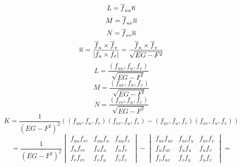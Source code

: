 \documentclass[main]{subfiles}
\begin{document}
    \begin{Proof}
      \[L = \overline{f}_{uu} \overline{n}\]
      \[M = \overline{f}_{uv} \overline{n}\]
      \[N = \overline{f}_{vv} \overline{n}\]
      \[\overline{n} = \frac{\overline{f}_u \times \overline{f}_v}{|f_u \times f_v|} = \frac{\overline{f}_u \times \overline{f}_v}{\sqrt{EG - F^2}}\]
      \[L = \frac{(f_{uu}, f_u, f_v)}{\sqrt{EG - F^2}}\]
      \[M = \frac{(f_{uv}, f_u, f_v)}{\sqrt{EG - F^2}}\]
      \[N = \frac{(f_{vv}, f_u, f_v)}{\sqrt{EG - F^2}}\]
      \[K = \frac{1}{(EG - F^2)^2} ( (f_{uu}, f_u, f_v)(f_{vv}, f_u, f_v) - (f_{uv}, f_u, f_v)(f_{uv}, f_u, f_v) )\]
      \[= \frac{1}{(EG - F^2)^2} \begin{vmatrix}
        f_{uu}f_{vv} & f_{uu}f_{u} & f_{uu}f_{v}\\
        f_{u}f_{vv} & f_{u}f_{u} & f_{u}f_{v}\\
        f_{v}f_{vv} & f_{v}f_{u} & f_{v}f_{v}
      \end{vmatrix} - \begin{vmatrix}
        f_{uv}f_{uv} & f_{uv}f_{u} & f_{uv}f_{v}\\
        f_{u}f_{uv} & f_{u}f_{u} & f_{u}f_{v}\\
        f_{v}f_{uv} & f_{v}f_{u} & f_{u}f_{v}
      \end{vmatrix} =\]


\end{Proof}
\end{document}
